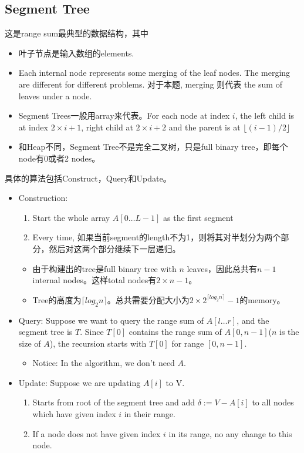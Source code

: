\subsection{Segment Tree}
这是range sum最典型的数据结构，其中
\begin{itemize}
\item 叶子节点是输入数组的elements.
\item Each internal node represents some merging of the leaf nodes. The merging are different for different problems. 对于本题, merging 则代表 the sum of leaves under a node.
\item Segment Trees一般用array来代表。For each node at index $i$, the left child is at index $2\times i+1$, right child at $2\times i+2$ and the parent is at $ \lfloor (i-1)/2\rfloor $ 
\item 和Heap不同，Segment Tree不是完全二叉树，只是full binary tree，即每个node有0或者2 nodes。
\end{itemize}
具体的算法包括Construct，Query和Update。
\begin{itemize}
\item Construction:
\begin{enumerate}
\item Start the whole array $A[0\ldots L-1]$ as the first segment
\item Every time, 如果当前segment的length不为1，则将其对半划分为两个部分，然后对这两个部分继续下一层递归。
\end{enumerate}
\begin{itemize}
\item 由于构建出的tree是full binary tree with $ n $ leaves，因此总共有$ n-1 $ internal nodes。这样total nodes有$ 2\times n -1 $。
\item Tree的高度为$ \lceil log_2{n}\rceil $。总共需要分配大小为$ 2\times 2^{\lceil log_2{n}\rceil}-1 $的memory。
\end{itemize}

\item Query: Suppose we want to query the range sum of $A[l\ldots r]$, and the segment tree is $T$.  Since $T[0]$ contains the range sum of $A[0,n-1]$($n$ is the size of $A$), the recursion starts with $T[0]$ for range $[0,n-1]$.
\begin{itemize}
\item Notice: In the algorithm, we don't need $A$.
\end{itemize}

\item Update:  Suppose we are updating $A[i]$ to V. 
\begin{enumerate}
\item Starts from root of the segment tree and add $ \delta:= V-A[i] $ to all nodes which have given index $ i $ in their range.
\item If a node does not have given index $ i $ in its range, no any change to this node.
\end{enumerate}

\end{itemize}
